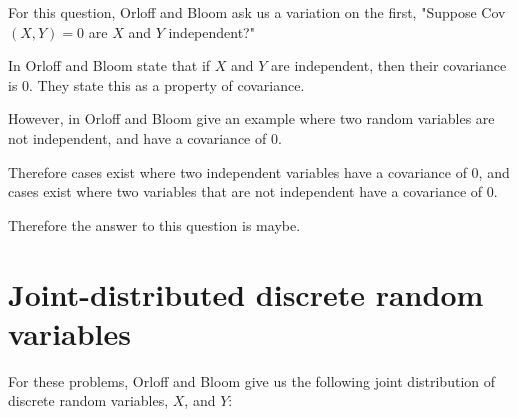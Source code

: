 \documentclass[a4paper,11pt]{article}
\begin{document}
For this question, Orloff and Bloom ask us a variation on the first, "Suppose
Cov$\left(X, Y\right)=0$ are $X$ and $Y$ independent?"

In \cite{reading7b} Orloff and Bloom state that if $X$ and $Y$ are independent,
then their covariance is 0.  They state this as a property of covariance.

However, in \cite{reading7b} Orloff and Bloom give an example where two
random variables are not independent, and have a covariance of $0$.

Therefore cases exist where two independent variables have a covariance of $0$,
and cases exist where two variables that are not independent have a covariance
of $0$.

Therefore the answer to this question is maybe.

\section{Joint-distributed discrete random variables}
For these problems, Orloff and Bloom give us the following joint distribution
of discrete random variables, $X$, and $Y$:


\printbibliography{}
\end{document}
